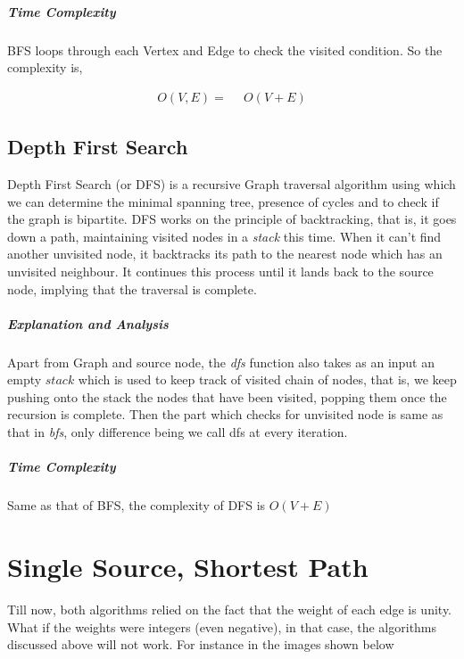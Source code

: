 \documentclass[11pt,a4paper]{extarticle}
\begin{document}
\subparagraph{Time Complexity}
BFS loops through each Vertex and Edge to check the visited condition. So the complexity is,

\begin{align}
O(V,E) =& \,\,\,O(V+E)
\end{align}

\subsection{Depth First Search}

Depth First Search (or DFS) is a recursive Graph traversal algorithm using which we can determine the minimal spanning tree, presence of cycles and to check if the graph is bipartite. DFS works on the principle of backtracking, that is, it goes down a path, maintaining visited nodes in a \textit{stack} this time. When it can't find another unvisited node, it backtracks its path to the nearest node which has an unvisited neighbour. It continues this process until it lands back to the source node, implying that the traversal is complete.


\begin{adjustwidth}{2.5em}{0pt}

\end{adjustwidth}

\subparagraph{Explanation and Analysis}
Apart from Graph and source node, the \textit{dfs} function also takes as an input an empty $stack$ which is used to keep track of visited chain of nodes, that is, we keep pushing onto the stack the nodes that have been visited, popping them once the recursion is complete. Then the part which checks for unvisited node is same as that in \textit{bfs}, only difference being we call dfs at every iteration.

\subparagraph{Time Complexity}
Same as that of BFS, the complexity of DFS is $O(V+E)$

\section{Single Source, Shortest Path}
Till now, both algorithms relied on the fact that the weight of each edge is unity. What if the weights were integers (even negative), in that case, the algorithms discussed above will not work. For instance in the images shown below
\end{document}
